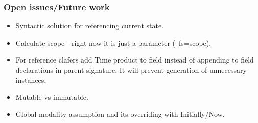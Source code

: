 \documentclass[xcolor=dvipsnames,mathserif,12pt,backend=biber]{beamer}
\begin{document}
  \begin{frame}
    \frametitle{Open issues/Future work}
    \begin{itemize}
      \item Syntactic solution for referencing current state.
      \item Calculate scope - right now it is just a parameter (--fs=scope).
      \item For reference clafers add Time product to  field instead of appending to field declarations in parent signature. It will prevent generation of unnecessary instances.
      \item Mutable vs immutable.
      \item Global modality assumption and its overriding with Initially/Now.
    \end{itemize}
  \end{frame}
\end{document}
